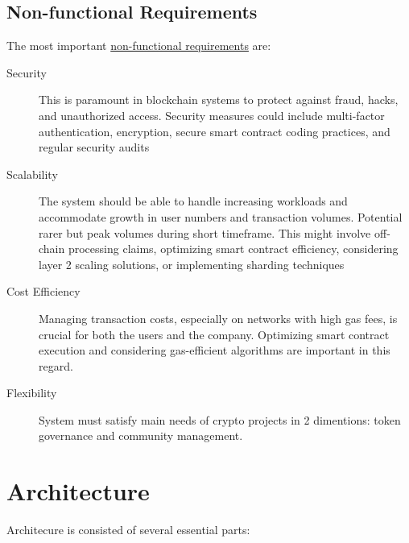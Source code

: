 \documentclass[12pt,oneside]{article}
\begin{document}
\subsection{Non-functional Requirements}
\label{sec:nfr}

The most important \href{https://en.wikipedia.org/wiki/Non-functional_requirement}{non-functional requirements} are:

\begin{description}
  \item[Security]
  This is paramount in blockchain systems to protect against fraud, hacks,
   and unauthorized access. Security measures could include multi-factor authentication, 
  encryption, secure smart contract coding practices, and regular security audits

  \item[Scalability]
  The system should be able to handle increasing workloads and 
  accommodate growth in user numbers and transaction volumes. Potential rarer but peak volumes during short timeframe.  
  This might involve off-chain processing claims, optimizing smart contract efficiency,
  considering layer 2 scaling solutions, or implementing sharding techniques

  \item[Cost Efficiency]
  Managing transaction costs, especially on networks with high gas fees, 
  is crucial for both the users and the company. 
  Optimizing smart contract execution and considering gas-efficient 
  algorithms are important in this regard.

  \item[Flexibility]
  System must satisfy main needs of crypto projects in 2 dimentions: 
  token governance and community management.

\end{description}

\section{Architecture}
Architecure is consisted of several essential parts:
\end{document}
